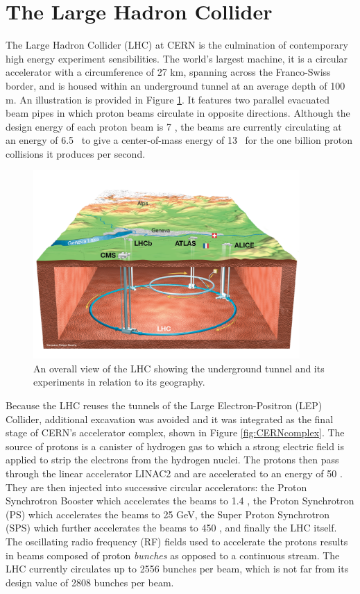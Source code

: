 \section{The Large Hadron Collider}

The Large Hadron Collider (LHC) at CERN is the culmination of contemporary high energy experiment sensibilities. The world's largest machine, it is a circular accelerator with a circumference of 27 km, spanning across the Franco-Swiss border, and is housed within an underground tunnel at an average depth of 100 m. An illustration is provided in Figure \ref{fig:LHCoverallview}. It features two parallel evacuated beam pipes in which proton beams circulate in opposite directions. Although the design energy of each proton beam is 7 \TeV, the beams are currently circulating at an energy of 6.5 \TeV\ to give a center-of-mass energy of 13 \TeV\ for the one billion proton collisions it produces per second.

\begin{figure}[htbp]
  \centering
    \includegraphics[width=4in]{images/LHC-illustration}
    \caption[Overall View of the LHC]{An overall view of the LHC showing the underground tunnel and its experiments in relation to its geography.\cite{LHCoverallview}}
    \label{fig:LHCoverallview}
\end{figure}

Because the LHC reuses the tunnels of the Large Electron-Positron (LEP) Collider, additional excavation was avoided and it was integrated as the final stage of CERN's accelerator complex, shown in Figure \ref{fig:CERNcomplex}. The source of protons is a canister of hydrogen gas to which a strong electric field is applied to strip the electrons from the hydrogen nuclei. The protons then pass through the linear accelerator LINAC2 and are accelerated to an energy of 50 \MeV. They are then injected into successive circular accelerators: the Proton Synchrotron Booster which accelerates the beams to 1.4 \GeV, the Proton Synchrotron (PS) which accelerates the beams to 25 GeV, the Super Proton Synchrotron (SPS) which further accelerates the beams to 450 \GeV, and finally the LHC itself. The oscillating radio frequency (RF) fields used to accelerate the protons results in beams composed of proton \textit{bunches} as opposed to a continuous stream. The LHC currently circulates up to 2556 bunches per beam, which is not far from its design value of 2808 bunches per beam.

